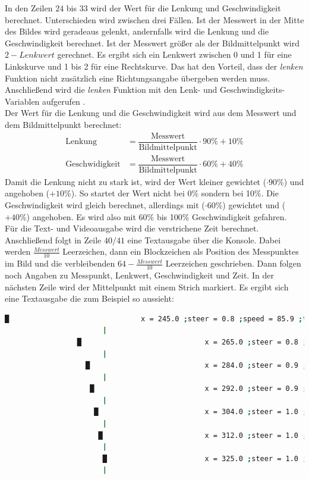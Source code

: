 \documentclass[a4paper, 12pt]{scrartcl}
\begin{document}
In den Zeilen $24$ bis $33$ wird der Wert für die Lenkung und Geschwindigkeit berechnet. Unterschieden wird zwischen drei Fällen. Ist der Messwert in der Mitte des Bildes wird geradeaus gelenkt, andernfalls wird die Lenkung und die Geschwindigkeit berechnet. Ist der Messwert größer als der Bildmittelpunkt wird $2-\textit{Lenkwert}$ gerechnet. Es ergibt sich ein Lenkwert zwischen 0 und 1 für eine Linkskurve und 1 bis 2 für eine Rechtskurve. Das hat den Vorteil, dass der \textit{lenken} Funktion nicht zusätzlich eine Richtungsangabe übergeben werden muss. Anschließend wird die \textit{lenken} Funktion mit den Lenk- und Geschwindigkeits-Variablen aufgerufen .\\

Der Wert für die Lenkung und die Geschwindigkeit wird aus dem Messwert und dem Bildmittelpunkt berechnet:
\begin{align}
	\text{Lenkung}&=\dfrac{\text{Messwert}}{\text{Bildmittelpunkt}}\cdot 90\% + 10\% \\
	\text{Geschwidigkeit}&=\dfrac{\text{Messwert}}{\text{Bildmittelpunkt}}\cdot 60\% + 40\%
\end{align}
Damit die Lenkung nicht zu stark ist, wird der Wert kleiner gewichtet ($\cdot 90\%$) und angehoben ($+10\%$). So startet der Wert nicht bei 0\% sondern bei 10\%.
Die Geschwindigkeit wird gleich berechnet, allerdings mit ($\cdot 60\%$) gewichtet und ($+40\%$) angehoben. Es wird also mit 60\% bis 100\% Geschwindigkeit gefahren.\\

Für die Text- und Videoausgabe wird die verstrichene Zeit berechnet.
Anschließend folgt in Zeile $40/41$ eine Textausgabe über die Konsole. Dabei werden $\frac{\textit{Messwert}}{10}$ Leerzeichen, dann ein Blockzeichen als Position des Messpunktes im Bild und die verbleibenden $64-\frac{\textit{Messwert}}{10}$ Leerzeichen geschrieben. Dann folgen noch Angaben zu Messpunkt, Lenkwert, Geschwindigkeit und Zeit. In der nächsten Zeile wird der Mittelpunkt mit einem Strich markiert. Es ergibt sich eine Textausgabe die zum Beispiel so aussieht:

\begin{lstlisting}[language=bash,basicstyle=\tiny,numbers=none]
               █                               x = 245.0 ;steer = 0.8 ;speed = 85.9 ;time = 00:00.00
                       |
                 █                             x = 265.0 ;steer = 0.8 ;speed = 89.7 ;time = 00:00.04
                       |
                   █                           x = 284.0 ;steer = 0.9 ;speed = 93.2 ;time = 00:00.08
                       |
                    █                          x = 292.0 ;steer = 0.9 ;speed = 94.8 ;time = 00:00.12
                       |
                     █                         x = 304.0 ;steer = 1.0 ;speed = 97.0 ;time = 00:00.16
                       |
                      █                        x = 312.0 ;steer = 1.0 ;speed = 98.5 ;time = 00:00.20
                       |
                       █                       x = 325.0 ;steer = 1.0 ;speed = 99.1 ;time = 00:00.24
                       |
\end{lstlisting}
\end{document}
